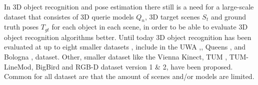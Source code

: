 \documentclass[10pt,twocolumn,letterpaper]{article}
\begin{document}
In 3D object recognition and pose estimation there still is a need for a large-scale dataset that consistes of 3D querie models $Q_n$, 3D target scenes $S_t$ and ground truth poses $T_{gt}$ for each object in each scene, in order to be able to evaluate 3D object recognition algorithms better. Until today 3D object recognition has been evaluated at up to eight smaller datasets \cite{Guo2015}, include in the UWA \cite{Mian2006},\cite{Mian2010}, Queens \cite{Taati2007},\cite{Taati2007} and Bologna \cite{Salti2014},\cite{Tombari2010} dataset. Other, smaller dataset like the Vienna Kinect\cite{Aldoma2012}, TUM \cite{Rodola2013}, TUM-LineMod\cite{Hinterstoisser2012}, BigBird\cite{BigBIRD} and RGB-D dataset version 1 \& 2\cite{Lai2011}, \cite{Lai2014} have been proposed. Common for all dataset are that the amount of scenes and/or models are limited.\\
\end{document}
